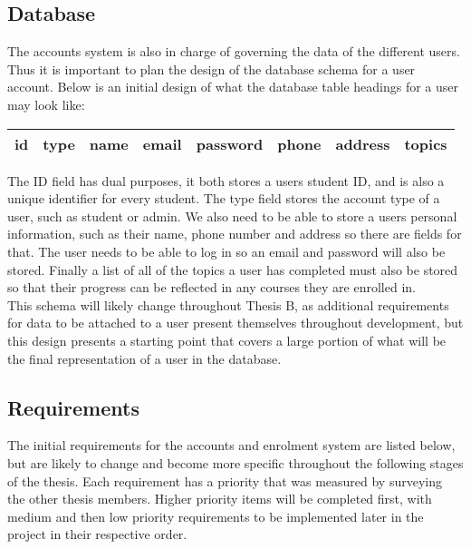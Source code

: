 \subsection{Database}
The accounts system is also in charge of governing the data of the different users. Thus it is important to plan the design of the database schema for a user account. Below is an initial design of what the database table headings for a user may look like:

\begin{center}
    \begin{tabular}{|c|c|c|c|c|c|c|c|} 
        \hline
        id & type & name & email & password & phone & address & topics \\ [0.5ex] 
        \hline
    \end{tabular}
\end{center}

The ID field has dual purposes, it both stores a users student ID, and is also a unique identifier for every student. The type field stores the account type of a user, such as student or admin. We also need to be able to store a users personal information, such as their name, phone number and address so there are fields for that. The user needs to be able to log in so an email and password will also be stored. Finally a list of all of the topics a user has completed must also be stored so that their progress can be reflected in any courses they are enrolled in.\\

This schema will likely change throughout Thesis B, as additional requirements for data to be attached to a user present themselves throughout development, but this design presents a starting point that covers a large portion of what will be the final representation of a user in the database.

\subsection{Requirements}
The initial requirements for the accounts and enrolment system are listed below, but are likely to change and become more specific throughout the following stages of the thesis. Each requirement has a priority that was measured by surveying the other thesis members. Higher priority items will be completed first, with medium and then low priority requirements to be implemented later in the project in their respective order.

